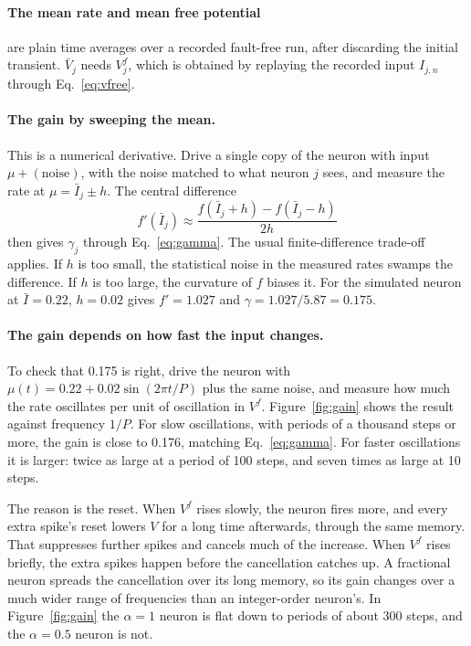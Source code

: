 \documentclass[11pt,a4paper]{article}
\begin{document}
\paragraph{The mean rate and mean free potential} are plain time averages over a recorded fault-free run, after discarding the initial transient. $\bar V_j$ needs $V^f_j$, which is obtained by replaying the recorded input $I_{j,n}$ through Eq.~\eqref{eq:vfree}.

\paragraph{The gain by sweeping the mean.} This is a numerical derivative. Drive a single copy of the neuron with input $\mu + (\text{noise})$, with the noise matched to what neuron $j$ sees, and measure the rate at $\mu = \bar I_j \pm h$. The central difference
\begin{equation*}
f'(\bar I_j) \approx \frac{f(\bar I_j + h) - f(\bar I_j - h)}{2h}
\end{equation*}
then gives $\gamma_j$ through Eq.~\eqref{eq:gamma}. The usual finite-difference trade-off applies. If $h$ is too small, the statistical noise in the measured rates swamps the difference. If $h$ is too large, the curvature of $f$ biases it. For the simulated neuron at $\bar I = 0.22$, $h = 0.02$ gives $f' = 1.027$ and $\gamma = 1.027/5.87 = 0.175$.

\paragraph{The gain depends on how fast the input changes.} To check that 0.175 is right, drive the neuron with $\mu(t) = 0.22 + 0.02\sin(2\pi t/P)$ plus the same noise, and measure how much the rate oscillates per unit of oscillation in $V^f$. Figure~\ref{fig:gain} shows the result against frequency $1/P$. For slow oscillations, with periods of a thousand steps or more, the gain is close to 0.176, matching Eq.~\eqref{eq:gamma}. For faster oscillations it is larger: twice as large at a period of 100 steps, and seven times as large at 10 steps.

The reason is the reset. When $V^f$ rises slowly, the neuron fires more, and every extra spike's reset lowers $V$ for a long time afterwards, through the same memory. That suppresses further spikes and cancels much of the increase. When $V^f$ rises briefly, the extra spikes happen before the cancellation catches up. A fractional neuron spreads the cancellation over its long memory, so its gain changes over a much wider range of frequencies than an integer-order neuron's. In Figure~\ref{fig:gain} the $\alpha = 1$ neuron is flat down to periods of about 300 steps, and the $\alpha = 0.5$ neuron is not.
\end{document}
